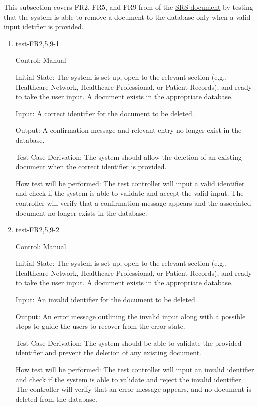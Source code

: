 \documentclass[12pt, titlepage]{article}
\begin{document}
This subsection covers FR2, FR5, and FR9 from of the \href{https://github.com/Inreet-Kaur/capstone/blob/main/docs/SRS/SRS.pdf}{SRS document} by testing that the system is able to remove a document to the database only when a valid input idetifier is provided.

\begin{enumerate}

\item{test-FR2,5,9-1} \label{test-FR2,5,9-1}

Control: Manual

Initial State: The system is set up, open to the relevant section (e.g., Healthcare Network, Healthcare Professional, or Patient Records), and ready to take the user input. A document exists in the appropriate database.

Input: A correct identifier for the document to be deleted.

Output: A confirmation message and relevant entry no longer exist in the database.

Test Case Derivation: The system should allow the deletion of an existing document when the correct identifier is provided. 

How test will be performed: The test controller will input a valid identifier and check if the system is able to validate and accept the valid input. The controller will verify that a confirmation message appears and the associated document no longer exists in the database.

					
\item{test-FR2,5,9-2} \label{test-FR2,5,9-2}

Control: Manual

Initial State: The system is set up, open to the relevant section (e.g., Healthcare Network, Healthcare Professional, or Patient Records), and ready to take the user input. A document exists in the appropriate database.

Input: An invalid identifier for the document to be deleted.

Output: An error message outlining the invalid input along with a possible steps to guide the users to recover from the error state.

Test Case Derivation: The system should be able to validate the provided identifier and prevent the deletion of any existing document. 

How test will be performed: The test controller will input an invalid identifier and check if the system is able to validate and reject the invalid identifier. The controller will verify that an error message appears, and no document is deleted from the database.

\end{enumerate}
\end{document}
